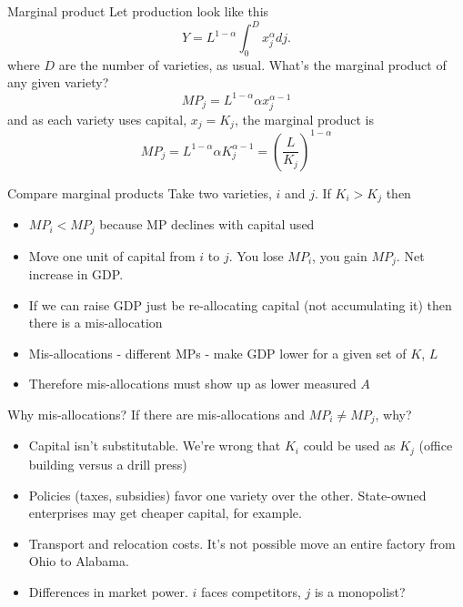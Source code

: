\begin{frame}{Marginal product}
Let production look like this
\begin{equation}
	Y = L^{1-\alpha} \int_{0}^{D} x_{j}^{\alpha} dj. \label{EQ_final_dev}
\end{equation}
where $D$ are the number of varieties, as usual. What's the marginal product of any given variety?
\begin{equation}
	MP_j = L^{1-\alpha} \alpha x_j^{\alpha-1}
\end{equation}
and as each variety uses capital, $x_j = K_j$, the marginal product is
\begin{equation}
	MP_j = L^{1-\alpha} \alpha K_j^{\alpha-1} = \left(\frac{L}{K_j}\right)^{1-\alpha}
\end{equation}
\end{frame}

\begin{frame}{Compare marginal products}
Take two varieties, $i$ and $j$. If $K_i > K_j$ then 
\begin{itemize}
	\item $MP_i < MP_j$ because MP declines with capital used
	\item Move one unit of capital from $i$ to $j$. You lose $MP_i$, you gain $MP_j$. Net increase in GDP.
	\item If we can raise GDP just be re-allocating capital (not accumulating it) then there is a mis-allocation
	\item Mis-allocations - different MPs - make GDP lower for a given set of $K$, $L$
	\item Therefore mis-allocations must show up as lower measured $A$
\end{itemize}
\end{frame}

\begin{frame}{Why mis-allocations?}
If there are mis-allocations and $MP_i \neq MP_j$, why? 
\begin{itemize}
	\item Capital isn't substitutable. We're wrong that $K_i$ could be used as $K_j$ (office building versus a drill press)
	\item Policies (taxes, subsidies) favor one variety over the other. State-owned enterprises may get cheaper capital, for example.
	\item Transport and relocation costs. It's not possible move an entire factory from Ohio to Alabama.
	\item Differences in market power. $i$ faces competitors, $j$ is a monopolist?
\end{itemize}

\end{frame}

